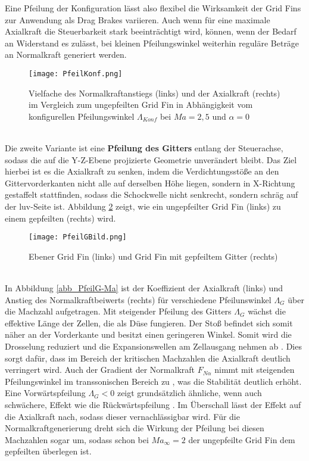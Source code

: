 Eine Pfeilung der Konfiguration lässt also flexibel die Wirksamkeit der Grid Fins zur Anwendung als Drag Brakes variieren. Auch wenn für eine maximale Axialkraft die Steuerbarkeit stark beeinträchtigt wird, können, wenn der Bedarf an Widerstand es zulässt, bei kleinen Pfeilungswinkel weiterhin reguläre Beträge an Normalkraft generiert werden.
\begin{figure}[h]
	\centering
	\texttt{[image: PfeilKonf.png]}
	\begin{flushright}
	\end{flushright}
	\caption{Vielfache des Normalkraftanstiegs (links) und der Axialkraft (rechts) im Vergleich zum ungepfeilten Grid Fin in Abhängigkeit vom konfigurellen Pfeilungswinkel $\Lambda_{Konf}$ bei $Ma = 2,5$ und $\alpha = 0$}
	\label{abb_lastvielfache}
\end{figure}\\
Die zweite Variante ist eine \textbf{Pfeilung des Gitters} entlang der Steuerachse, sodass die auf die Y-Z-Ebene projizierte Geometrie unverändert bleibt. Das Ziel hierbei ist es die Axialkraft zu senken, indem die Verdichtungsstöße an den Gittervorderkanten nicht alle auf derselben Höhe liegen, sondern in X-Richtung gestaffelt stattfinden, sodass die Schockwelle nicht senkrecht, sondern schräg auf der luv-Seite ist. Abbildung \ref{abb_PfeilG} zeigt, wie ein ungepfeilter Grid Fin (links) zu einem gepfeilten (rechts) wird.
\begin{figure}[h]
	\centering
	\texttt{[image: PfeilGBild.png]}
	\begin{flushright}
			\flushbottom{\cite{PfeilG3}}
	\end{flushright}
	\caption{Ebener Grid Fin (links) und Grid Fin mit gepfeiltem Gitter (rechts)}
	\label{abb_PfeilG}
\end{figure}\\
In Abbildung \ref{abb_PfeilG-Ma} ist der Koeffizient der Axialkraft (links) und Anstieg des Normalkraftbeiwerts (rechts) für verschiedene Pfeilunswinkel $\Lambda_{G}$ über die Machzahl aufgetragen. Mit steigender Pfeilung des Gitters $\Lambda_G$ wächst die effektive Länge der Zellen, die als Düse fungieren. Der Stoß befindet sich somit näher an der Vorderkante und besitzt einen geringeren Winkel. Somit wird die Drosselung reduziert und die Expansionswellen am Zellausgang nehmen ab \cite{PfeilG1}. Dies sorgt dafür, dass im Bereich der kritischen Machzahlen die Axialkraft deutlich verringert wird. Auch der Gradient der Normalkraft $F_{N\alpha}$ nimmt mit steigenden Pfeilungswinkel im transsonischen Bereich zu \cite{PfeilG1}, was die Stabilität deutlich erhöht. Eine Vorwärtspfeilung $\Lambda_{G} < 0$ zeigt grundsätzlich ähnliche, wenn auch schwächere, Effekt wie die Rückwärtspfeilung \cite{PfeilG2}. Im Überschall lässt der Effekt auf die Axialkraft nach, sodass dieser vernachlässigbar wird. Für die Normalkraftgenerierung dreht sich die Wirkung der Pfeilung bei diesen Machzahlen sogar um, sodass schon bei $Ma_\infty=2$ der ungepfeilte Grid Fin dem gepfeilten überlegen ist.

